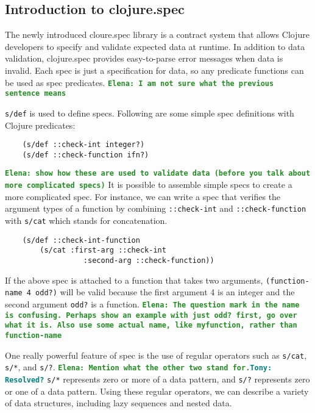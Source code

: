 \documentclass[12pt]{article}
\newcommand{\comment}[1]{{\bf \tt  {#1}}}
\newcommand{\emcomment}[1]{\textcolor{ForestGreen}{\comment{Elena: {#1}}}}
\newcommand{\tscomment}[1]{\textcolor{Teal}{\comment{Tony: {#1}}}}
\begin{document}
	\subsection{Introduction to clojure.spec}
	The newly introduced cloure.spec library is a contract system that allows Clojure developers to specify and validate expected data 
	at runtime. In addition to data validation, clojure.spec provides easy-to-parse error messages when data is invalid. Each spec is just a 				 
	specification for data, so any predicate functions can be used as spec predicates. 
	\emcomment{I am not sure what the previous sentence means}

	\texttt{s/def} is used to define specs. Following are 
	some simple spec definitions with Clojure predicates:
	\begin{verbatim}
	(s/def ::check-int integer?)
	(s/def ::check-function ifn?)
	\end{verbatim}
	\emcomment{show how these are used to validate data (before you talk about more complicated specs)}
	It is possible to assemble simple specs to create a more complicated spec. For instance, we can write a spec that verifies 
	the argument types of a function by combining \texttt{::check-int} and \texttt{::check-function} with \texttt{s/cat} 
	which stands for concatenation. 
	\begin{verbatim}
	(s/def ::check-int-function 
		(s/cat :first-arg ::check-int 
		          :second-arg ::check-function))
	\end{verbatim}
	If the above spec is attached to a function that takes two arguments, {\tt (function-name 4 odd?)} will be valid because 
	the first argument 4 is an integer and the second argument {\tt odd?} is a function.
	\emcomment{The question mark in the name is confusing. Perhaps show an example with just odd? first, go over what it is. 
	Also use some actual name, like myfunction, rather than function-name}
	
	One really powerful feature of spec is the use of regular operators such as \texttt{s/cat}, \texttt{s/*}, and \texttt{s/?}. 
	\emcomment{Mention what the other two stand for.}\tscomment{Resolved?}
	\texttt{s/*} represents zero or more of a data pattern, and \texttt{s/?} represents zero or one of a data pattern.
	Using these regular operators, we can describe a variety of data structures, including lazy sequences and nested data. 
\end{document}
